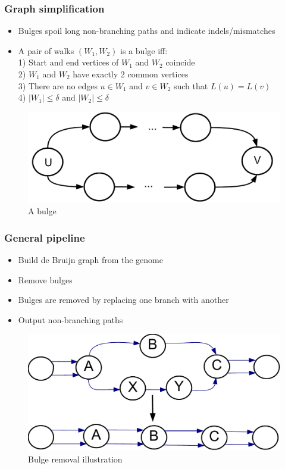 \documentclass[svgnames,14pt]{beamer}
\begin{document}
\begin{frame}
\frametitle{Graph simplification}
\begin{itemize}
\item Bulges spoil long non-branching paths and indicate indels/mismatches
\item A pair of walks \((W_{1}, W_{2})\) is a bulge iff: \\
1) Start and end vertices of  \(W_{1} \) and  \(W_{2}\) coincide\\
2) \(W_{1} \) and  \(W_{2}\) have exactly 2 common vertices \\
3) There are no edges \(u \in W_{1} \) and \( v \in W_{2}\) such that \(L(u) = L(v) \) \\
4) \(|W_{1}|  \leq \delta \) and \(|W_{2}| \leq \delta \)
\end{itemize}
\begin{changemargin}{-1.cm}{-1.cm}
\begin{figure}
\centering
\includegraphics[scale = 0.30]{Figure2.pdf}
\small \caption{A bulge}
\end{figure}
\end{changemargin}
\end{frame}

\begin{frame}
\frametitle{General pipeline}
\begin{itemize}
\item Build de Bruijn graph from the genome
\item Remove bulges
\item Bulges are removed by replacing one branch with another
\item Output non-branching paths
\end{itemize}
\begin{changemargin}{-1.cm}{-1.cm}
\begin{figure}
\centering
\includegraphics[scale = 0.45]{Figure3.pdf}
\small \caption{Bulge removal illustration}
\end{figure}
\end{changemargin}
\end{frame}
\end{document}
